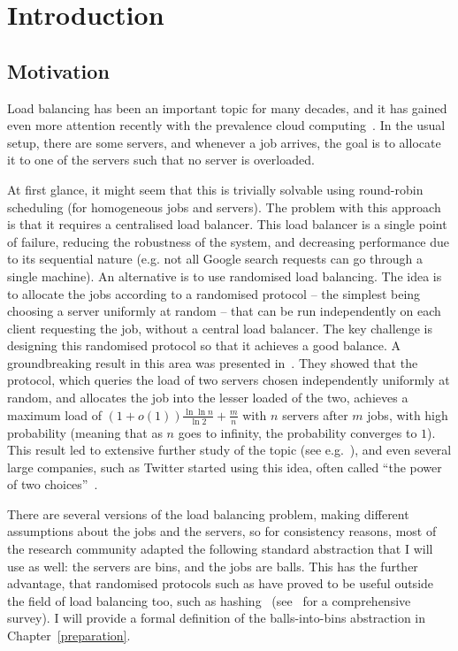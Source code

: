 \chapter{Introduction}\label{introduction}

\ifpdf
    \graphicspath{{Chapter1/Figs/Raster/}{Chapter1/Figs/PDF/}{Chapter1/Figs/}}
\else
    \graphicspath{{Chapter1/Figs/Vector/}{Chapter1/Figs/}}
\fi


\section{Motivation}

Load balancing has been an important topic for many decades, and it has gained even more attention recently with the prevalence cloud computing~\cite{mishra2020cloud}. In the usual setup, there are some servers, and whenever a job arrives, the goal is to allocate it to one of the servers such that no server is overloaded.


At first glance, it might seem that this is trivially solvable using round-robin scheduling (for homogeneous jobs and servers). The problem with this approach is that it requires a centralised load balancer. This load balancer is a single point of failure, reducing the robustness of the system, and decreasing performance due to its sequential nature (e.g. not all Google search requests can go through a single machine). An alternative is to use randomised load balancing. The idea is to allocate the jobs according to a randomised protocol -- the simplest being choosing a server uniformly at random -- that can be run independently on each client requesting the job, without a central load balancer. The key challenge is designing this randomised protocol so that it achieves a good balance. A groundbreaking result in this area was presented in~\cite{azar1999twochoice}. They showed that the \TwoChoice protocol, which queries the load of two servers chosen independently uniformly at random, and allocates the job into the lesser loaded of the two, achieves a maximum load of $(1+o(1))\frac{\ln\ln n}{\ln 2} + \frac{m}{n}$ with $n$ servers after $m$ jobs, with high probability (meaning that as $n$ goes to infinity, the probability converges to $1$). This result led to extensive further study of the topic (see e.g.~\cite{richa2001surveytwochoice}), and even several large companies, such as Twitter started using this idea, often called ``the power of two choices''~\cite{anderson2019twitter}.


There are several versions of the load balancing problem, making different assumptions about the jobs and the servers, so for consistency reasons, most of the research community adapted the following standard abstraction that I will use as well: the servers are bins, and the jobs are balls. This has the further advantage, that randomised protocols such as \TwoChoice have proved to be useful outside the field of load balancing too, such as hashing~\cite{azar1999twochoice} (see~\cite{wieder2017ballsintobinslandscape} for a comprehensive survey). I will provide a formal definition of the balls-into-bins abstraction in Chapter~\ref{preparation}.

